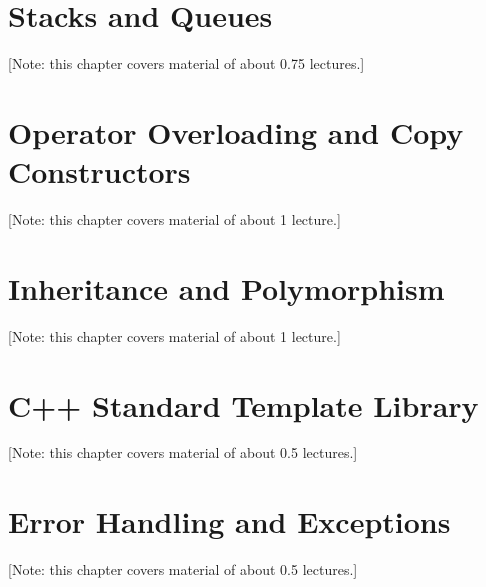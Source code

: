 \documentclass{book}
\begin{document}


\chapter{Stacks and Queues}
\label{chap:stacksqueues}
[Note: this chapter covers material of about 0.75 lectures.]




\chapter{Operator Overloading and Copy Constructors}
\label{chap:overloading}
[Note: this chapter covers material of about 1 lecture.]





\chapter{Inheritance and Polymorphism}
\label{chap:inheritance}
[Note: this chapter covers material of about 1 lecture.]



\chapter{C++ Standard Template Library}
\label{chap:STL}
[Note: this chapter covers material of about 0.5 lectures.]



\chapter{Error Handling and Exceptions}
\label{chap:exceptions}
[Note: this chapter covers material of about 0.5 lectures.]



\end{document}
